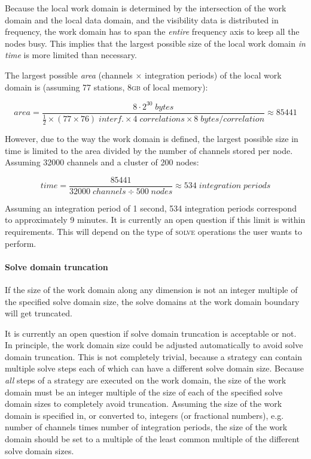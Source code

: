 \documentclass[10pt]{lofar}
\newcommand{\solve}{\textsc{solve}\xspace}
\begin{document}
Because the local work domain is determined by the intersection of the work
domain and the local data domain, and the visibility data is distributed in
frequency, the work domain has to span the \emph{entire} frequency axis to keep
all the nodes busy. This implies that the largest possible size of the local
work domain \emph{in time} is more limited than necessary.

The largest possible \emph{area} (channels $\times$ integration periods) of the
local work domain is (assuming 77 stations, 8\textsc{gb} of local memory):

\[
area=\frac{8\cdot2^{30}\;bytes}{\frac{1}{2}\times(77 \times 76) \; interf.
\times 4 \; correlations \times 8 \; bytes/correlation} \approx 85441
\]

However, due to the way the work domain is defined, the largest possible size in
time is limited to the area divided by the number of channels stored per node.
Assuming 32000 channels and a cluster of 200 nodes:

\[
time=\frac{85441}{32000\;channels \div 500\;nodes} \approx 534\;integration\;
periods
\]

Assuming an integration period of 1 second, 534 integration periods correspond
to approximately 9 minutes. It is currently an open question if this limit is
within requirements. This will depend on the type of \solve operations the user
wants to perform.

\paragraph{Solve domain truncation}

If the size of the work domain along any dimension is not an integer multiple of
the specified solve domain size, the solve domains at the work domain boundary
will get truncated. 

It is currently an open question if solve domain truncation is acceptable or not.
In principle, the work domain size could be adjusted automatically to avoid
solve domain truncation. This is not completely trivial, because a strategy can
contain multiple solve steps each of which can have a different solve domain
size. Because \emph{all} steps of a strategy are executed on the work domain,
the size of the work domain must be an integer multiple of the size of each of
the specified solve domain sizes to completely avoid truncation. Assuming the
size of the work domain is specified in, or converted to, integers (or
fractional numbers), e.g. number of channels times number of integration
periods, the size of the work domain should be set to a multiple of the least
common multiple of the different solve domain sizes.
\end{document}
